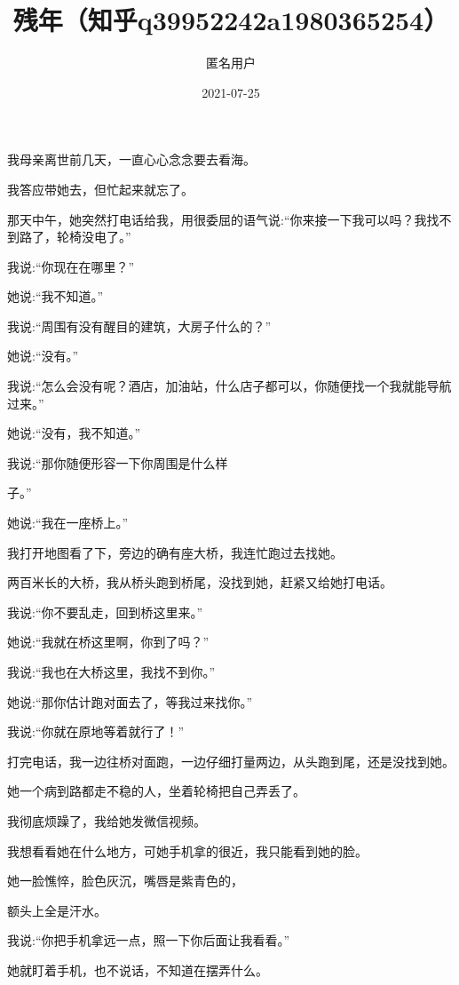 \documentclass{article}
\title{残年（知乎q39952242a1980365254）}
\author{匿名用户}
\date{2021-07-25}
\begin{document}

\maketitle


\Large

﻿我母亲离世前几天，一直心心念念要去看海。

我答应带她去，但忙起来就忘了。

那天中午，她突然打电话给我，用很委屈的语气说:“你来接一下我可以吗？我找不到路了，轮椅没电了。”

我说:“你现在在哪里？”

她说:“我不知道。”

我说:“周围有没有醒目的建筑，大房子什么的？”

她说:“没有。”

我说:“怎么会没有呢？酒店，加油站，什么店子都可以，你随便找一个我就能导航过来。”

她说:“没有，我不知道。”

我说:“那你随便形容一下你周围是什么样

\newpage 

子。”

她说:“我在一座桥上。”

我打开地图看了下，旁边的确有座大桥，我连忙跑过去找她。

两百米长的大桥，我从桥头跑到桥尾，没找到她，赶紧又给她打电话。

我说:“你不要乱走，回到桥这里来。”

她说:“我就在桥这里啊，你到了吗？”

我说:“我也在大桥这里，我找不到你。”

她说:“那你估计跑对面去了，等我过来找你。”

我说:“你就在原地等着就行了！”

打完电话，我一边往桥对面跑，一边仔细打量两边，从头跑到尾，还是没找到她。

她一个病到路都走不稳的人，坐着轮椅把自己弄丢了。

我彻底烦躁了，我给她发微信视频。

我想看看她在什么地方，可她手机拿的很近，我只能看到她的脸。

她一脸憔悴，脸色灰沉，嘴唇是紫青色的，

\newpage 

额头上全是汗水。

我说:“你把手机拿远一点，照一下你后面让我看看。”

她就盯着手机，也不说话，不知道在摆弄什么。
\end{document}

